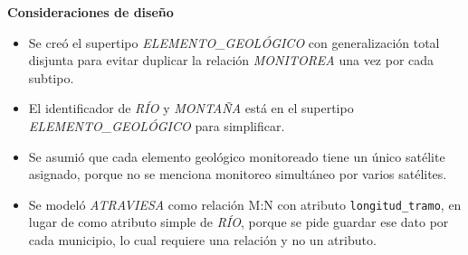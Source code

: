 \textbf{Consideraciones de diseño}

\begin{itemize}
	\item Se creó el supertipo \textit{ELEMENTO\_GEOLÓGICO} con generalización total disjunta para evitar duplicar la relación \textit{MONITOREA} una vez por cada subtipo.
	\item El identificador de \textit{RÍO} y \textit{MONTAÑA} está en el supertipo \textit{ELEMENTO\_GEOLÓGICO} para simplificar.
	\item Se asumió que cada elemento geológico monitoreado tiene un único satélite asignado, porque no se menciona monitoreo simultáneo por varios satélites.
	\item Se modeló \textit{ATRAVIESA} como relación M:N con atributo \texttt{longitud\_tramo}, en lugar de como atributo simple de \textit{RÍO}, porque se pide guardar ese dato por cada municipio, lo cual requiere una relación y no un atributo.
\end{itemize}
